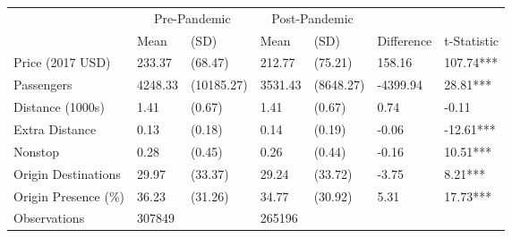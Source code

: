 
\begin{tabular}[t]{lllllll}
\toprule
\multicolumn{1}{c}{ } & \multicolumn{2}{c}{Pre-Pandemic} & \multicolumn{2}{c}{Post-Pandemic} & \multicolumn{2}{c}{ } \\
\cmidrule(l{3pt}r{3pt}){2-3} \cmidrule(l{3pt}r{3pt}){4-5}
 & Mean & (SD) & Mean & (SD) & Difference & t-Statistic\\
\midrule
Price (2017 USD) & 233.37 & (68.47) & 212.77 & (75.21) & 158.16 & 107.74***\\
Passengers & 4248.33 & (10185.27) & 3531.43 & (8648.27) & -4399.94 & 28.81***\\
Distance (1000s) & 1.41 & (0.67) & 1.41 & (0.67) & 0.74 & -0.11\\
Extra Distance & 0.13 & (0.18) & 0.14 & (0.19) & -0.06 & -12.61***\\
Nonstop & 0.28 & (0.45) & 0.26 & (0.44) & -0.16 & 10.51***\\
\addlinespace
Origin Destinations & 29.97 & (33.37) & 29.24 & (33.72) & -3.75 & 8.21***\\
Origin Presence (\%) & 36.23 & (31.26) & 34.77 & (30.92) & 5.31 & 17.73***\\
Observations & 307849 &  & 265196 &  &  & \\
\bottomrule
\end{tabular}
